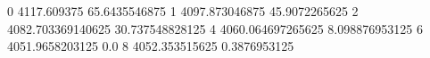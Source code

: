 0 4117.609375 65.6435546875
1 4097.873046875 45.9072265625
2 4082.703369140625 30.737548828125
4 4060.064697265625 8.098876953125
6 4051.9658203125 0.0
8 4052.353515625 0.3876953125
